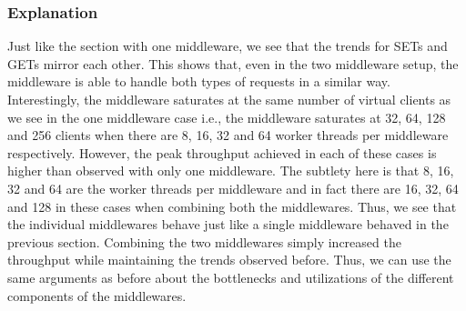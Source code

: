 \documentclass[11pt,a4paper]{article}
\newcommand\instructions[1]{\textcolor{blue}{Instructions: #1}}
\begin{document}
\subsubsection{Explanation}


Just like the section with one middleware, we see that the trends for SETs and GETs mirror each other. This shows that, even in the two middleware setup, the middleware is able to handle both types of requests in a similar way. Interestingly, the middleware saturates at the same number of virtual clients as we see in the one middleware case i.e., the middleware saturates at 32, 64, 128 and 256 clients when there are 8, 16, 32 and 64 worker threads per middleware respectively. However, the peak throughput achieved in each of these cases is higher than observed with only one middleware. The subtlety here is that 8, 16, 32 and 64 are the worker threads per middleware and in fact there are 16, 32, 64 and 128 in these cases when combining both the middlewares. Thus, we see that the individual middlewares behave just like a single middleware behaved in the previous section. Combining the two middlewares simply increased the throughput while maintaining the trends observed before. Thus, we can use the same arguments as before about the bottlenecks and utilizations of the different components of the middlewares.
\end{document}
